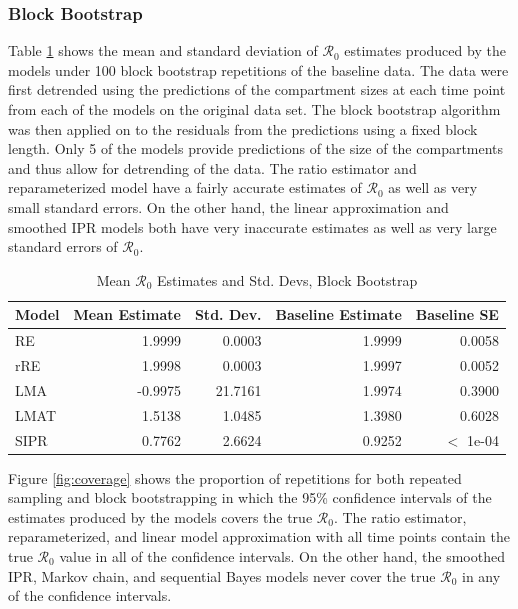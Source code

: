 \documentclass[12pt]{article}
\newcommand{\rr}{\ensuremath{\mathcal{R}_0}}
\begin{document}
\subsubsection{Block Bootstrap}

Table \ref{tab:bb-samp} shows the mean and standard deviation of $\rr$ estimates produced by the models under 100 block bootstrap repetitions of the baseline data. The data were first detrended using the predictions of the compartment sizes at each time point from each of the models on the original data set. The block bootstrap algorithm was then applied on to the residuals from the predictions using a fixed block length. Only 5 of the models provide predictions of the size of the compartments and thus allow for detrending of the data. The ratio estimator and reparameterized model have a fairly accurate estimates of $\rr$ as well as very small standard errors. On the other hand, the linear approximation and smoothed IPR models both have very inaccurate estimates as well as very large standard errors of $\rr$.

\begin{table}[H]
	
	\centering
	\begin{tabular}[t]{l|r|r|r|r}
		\hline
		Model & Mean Estimate & Std. Dev. & Baseline Estimate & Baseline SE\\
		\hline
		RE & 1.9999 & 0.0003 & 1.9999 & 0.0058\\
		\hline
		rRE & 1.9998 & 0.0003 & 1.9997 & 0.0052\\
		\hline
		LMA & -0.9975 & 21.7161 & 1.9974 & 0.3900\\
		\hline
		LMAT & 1.5138 & 1.0485 & 1.3980 & 0.6028 \\
		\hline
		SIPR & 0.7762 & 2.6624 & 0.9252 & $<$ 1e-04 \\
		\hline
	\end{tabular}
	\caption{Mean $\rr$ Estimates and Std. Devs, Block Bootstrap}
	\label{tab:bb-samp}
\end{table}

Figure \ref{fig:coverage} shows the proportion of repetitions for both repeated sampling and block bootstrapping in which the 95\% confidence intervals of the estimates produced by the models covers the true $\rr$. The ratio estimator, reparameterized, and linear model approximation with all time points contain the true $\rr$ value in all of the confidence intervals. On the other hand, the smoothed IPR, Markov chain, and sequential Bayes models never cover the true $\rr$ in any of the confidence intervals.
\end{document}
